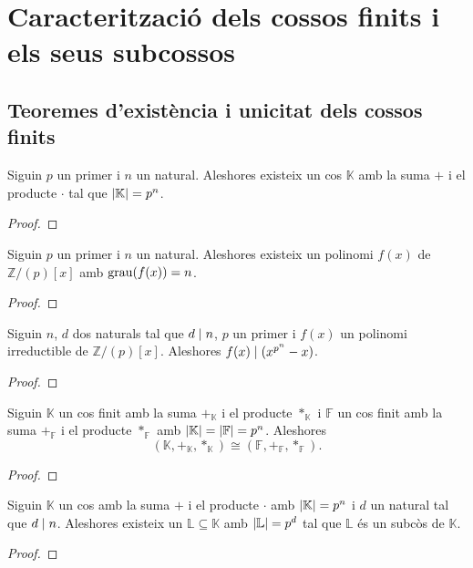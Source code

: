 \documentclass[../Apunts.tex]{subfiles}
\begin{document}
	\section{Caracterització dels cossos finits i els seus subcossos}
	\subsection{Teoremes d'existència i unicitat dels cossos finits}
	\begin{theorem}
		Siguin \(p\) un primer i \(n\) un natural. Aleshores existeix un cos \(\mathbb{K}\) amb la suma \(+\) i el producte \(\cdot\) tal que \(\abs{\mathbb{K}}=p^{n}\).
		\begin{proof}
		\end{proof}
	\end{theorem}
	\begin{corollary}
		Siguin \(p\) un primer i \(n\) un natural. Aleshores existeix un polinomi \(f(x)\) de \(\mathbb{Z}/(p)[x]\) amb \(\operatorname{grau}(f(x))=n\).
		\begin{proof}
		\end{proof}
	\end{corollary}
	\begin{lemma}
		Siguin \(n\), \(d\) dos naturals tal que \(d\mathrel{|} n\), \(p\) un primer i \(f(x)\) un polinomi irreductible de \(\mathbb{Z}/(p)[x]\). Aleshores \(f(x)\mathrel{|}(x^{p^{n}}-x)\).
		\begin{proof}
		\end{proof}
	\end{lemma}
	\begin{theorem}
		Siguin \(\mathbb{K}\) un cos finit amb la suma \(+_{\mathbb{K}}\) i el producte \(\ast_{\mathbb{K}}\) i \(\mathbb{F}\) un cos finit amb la suma \(+_{\mathbb{F}}\) i el producte \(\ast_{\mathbb{F}}\) amb \(\abs{\mathbb{K}}=\abs{\mathbb{F}}=p^{n}\). Aleshores
		\[(\mathbb{K},+_{\mathbb{K}},\ast_{\mathbb{K}})\cong(\mathbb{F},+_{\mathbb{F}},\ast_{\mathbb{F}}).\]
		\begin{proof}
		\end{proof}
	\end{theorem}
	\begin{theorem}
		Siguin \(\mathbb{K}\) un cos amb la suma \(+\) i el producte \(\cdot\) amb \(\abs{\mathbb{K}}=p^{n}\) i \(d\) un natural tal que \(d\mathrel{|} n\). Aleshores existeix un \(\mathbb{L}\subseteq\mathbb{K}\) amb \(\abs{\mathbb{L}}=p^{d}\) tal que \(\mathbb{L}\) és un subcòs de \(\mathbb{K}\).
		\begin{proof}
		\end{proof}
	\end{theorem}
\end{document}
